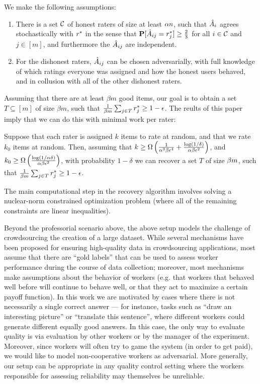 We make the following assumptions:
\begin{enumerate}
\item There is a set $\mathcal{C}$ of honest raters of size at least $\alpha n$, 
      such that $\hat{A}_i$ agrees stochastically with $r^*$ in the sense that 
      $\mathbf{P}[\hat{A}_{ij} = r^*_j] \geq \frac{2}{3}$ for all $i \in \mathcal{C}$ and 
      $j \in [m]$, and furthermore the $\hat{A}_{ij}$ are independent.
\item For the dishonest raters, $\hat{A}_{ij}$ can be chosen adversarially, 
      with full knowledge of which ratings everyone was assigned and how the 
      honest users behaved, and in collusion with all of the other 
      dishonest raters.
\end{enumerate}
Assuming that there are at least $\beta m$ good items, our goal is to obtain 
a set $T \subseteq [m]$ of size $\beta m$, such that 
$\frac{1}{\beta m} \sum_{j \in T} r^*_j \geq 1-\epsilon$.
The reults of this paper imply that we can do this with minimal work per rater:
\begin{theorem}
\label{thm:main-1}
Suppose that each rater is assigned $k$ items to rate at random, and that we rate 
$k_0$ items at random. Then, assuming that $k \geq \Omega\left( \frac{1}{\alpha^3\beta\epsilon^4} + \frac{\log(1/\delta)}{\alpha\beta\epsilon^2} \right)$, and 
$k_0 \geq \Omega\left( \frac{\log(1/\alpha\delta)}{\alpha\beta\epsilon^2} \right)$, 
with probability $1-\delta$ we can recover a set $T$ of size $\beta m$, 
such that $\frac{1}{\beta m} \sum_{j \in T} r^*_j \geq 1-\epsilon$.
\end{theorem}
The main computational step in the recovery algorithm involves solving a 
nuclear-norm constrained optimization problem (where all of the remaining 
constraints are linear inequalities). 

Beyond the professorial scenario above, the above setup
models the challenge of crowdsourcing the creation of a large 
dataset. While several mechanisms have been proposed for ensuring high-quality 
data in crowdsourcing applications, most assume that there are ``gold labels'' 
that can be used to assess worker performance during the course of 
data collection; moreover, most mechanisms make assumptions about the behavior 
of workers (e.g. that workers that behaved well before will continue to 
behave well, or that they act to maximize a certain payoff function).
In this work we are motivated by cases where there is not necessarily a single 
correct answer --- for instance, tasks such as ``draw an interesting picture'' 
or ``translate this sentence'', where different workers could generate different 
equally good answers. In this case, the only way to evaluate quality is 
via evaluation by other workers or by the manager of the experiment. 
Moreover, since workers will often try to game the system (in order to 
get paid), we would like to model non-cooperative workers as adversarial. 
More generally, our setup can be appropriate in any quality 
control setting where the workers responsible for assessing reliability 
may themselves be unreliable. 

